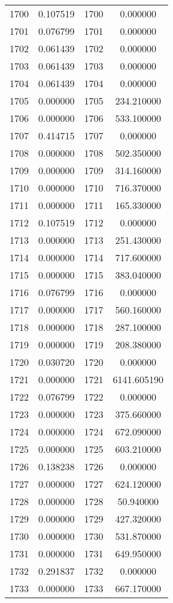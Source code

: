\documentclass[12pt]{article}
\begin{document}
\begin{longtable}{@{}cccc@{}}
1700 & 0.107519 & 1700 & 0.000000 \\
1701 & 0.076799 & 1701 & 0.000000 \\
1702 & 0.061439 & 1702 & 0.000000 \\
1703 & 0.061439 & 1703 & 0.000000 \\
1704 & 0.061439 & 1704 & 0.000000 \\
1705 & 0.000000 & 1705 & 234.210000 \\
1706 & 0.000000 & 1706 & 533.100000 \\
1707 & 0.414715 & 1707 & 0.000000 \\
1708 & 0.000000 & 1708 & 502.350000 \\
1709 & 0.000000 & 1709 & 314.160000 \\
1710 & 0.000000 & 1710 & 716.370000 \\
1711 & 0.000000 & 1711 & 165.330000 \\
1712 & 0.107519 & 1712 & 0.000000 \\
1713 & 0.000000 & 1713 & 251.430000 \\
1714 & 0.000000 & 1714 & 717.600000 \\
1715 & 0.000000 & 1715 & 383.040000 \\
1716 & 0.076799 & 1716 & 0.000000 \\
1717 & 0.000000 & 1717 & 560.160000 \\
1718 & 0.000000 & 1718 & 287.100000 \\
1719 & 0.000000 & 1719 & 208.380000 \\
1720 & 0.030720 & 1720 & 0.000000 \\
1721 & 0.000000 & 1721 & 6141.605190 \\
1722 & 0.076799 & 1722 & 0.000000 \\
1723 & 0.000000 & 1723 & 375.660000 \\
1724 & 0.000000 & 1724 & 672.090000 \\
1725 & 0.000000 & 1725 & 603.210000 \\
1726 & 0.138238 & 1726 & 0.000000 \\
1727 & 0.000000 & 1727 & 624.120000 \\
1728 & 0.000000 & 1728 & 50.940000 \\
1729 & 0.000000 & 1729 & 427.320000 \\
1730 & 0.000000 & 1730 & 531.870000 \\
1731 & 0.000000 & 1731 & 649.950000 \\
1732 & 0.291837 & 1732 & 0.000000 \\
1733 & 0.000000 & 1733 & 667.170000 \\

\end{longtable}
\end{document}
